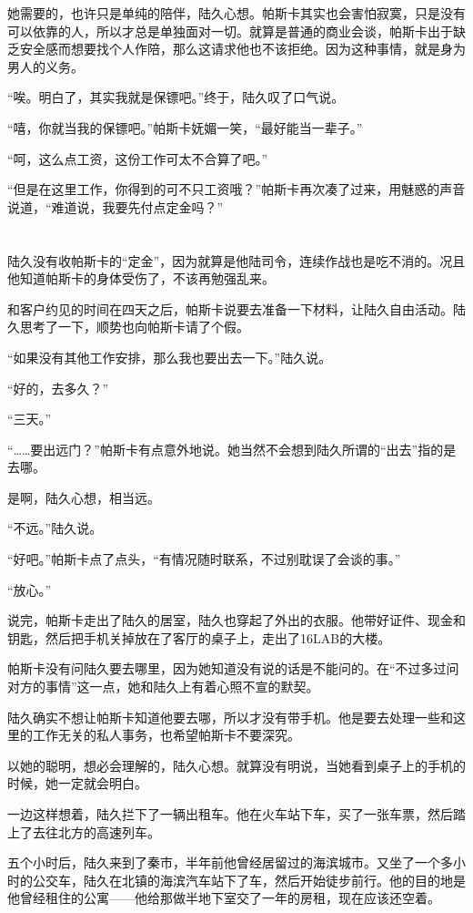 她需要的，也许只是单纯的陪伴，陆久心想。帕斯卡其实也会害怕寂寞，只是没有可以依靠的人，所以才总是单独面对一切。就算是普通的商业会谈，帕斯卡出于缺乏安全感而想要找个人作陪，那么这请求他也不该拒绝。因为这种事情，就是身为男人的义务。

“唉。明白了，其实我就是保镖吧。”终于，陆久叹了口气说。

“嘻，你就当我的保镖吧。”帕斯卡妩媚一笑，“最好能当一辈子。”

“呵，这么点工资，这份工作可太不合算了吧。”

“但是在这里工作，你得到的可不只工资哦？”帕斯卡再次凑了过来，用魅惑的声音说道，“难道说，我要先付点定金吗？”\section*{}

陆久没有收帕斯卡的“定金”，因为就算是他陆司令，连续作战也是吃不消的。况且他知道帕斯卡的身体受伤了，不该再勉强乱来。

和客户约见的时间在四天之后，帕斯卡说要去准备一下材料，让陆久自由活动。陆久思考了一下，顺势也向帕斯卡请了个假。

“如果没有其他工作安排，那么我也要出去一下。”陆久说。

“好的，去多久？”

“三天。”

“……要出远门？”帕斯卡有点意外地说。她当然不会想到陆久所谓的“出去”指的是去哪。

是啊，陆久心想，相当远。

“不远。”陆久说。

“好吧。”帕斯卡点了点头，“有情况随时联系，不过别耽误了会谈的事。”

“放心。”

说完，帕斯卡走出了陆久的居室，陆久也穿起了外出的衣服。他带好证件、现金和钥匙，然后把手机关掉放在了客厅的桌子上，走出了16LAB的大楼。

帕斯卡没有问陆久要去哪里，因为她知道没有说的话是不能问的。在“不过多过问对方的事情”这一点，她和陆久上有着心照不宣的默契。

陆久确实不想让帕斯卡知道他要去哪，所以才没有带手机。他是要去处理一些和这里的工作无关的私人事务，也希望帕斯卡不要深究。

以她的聪明，想必会理解的，陆久心想。就算没有明说，当她看到桌子上的手机的时候，她一定就会明白。

一边这样想着，陆久拦下了一辆出租车。他在火车站下车，买了一张车票，然后踏上了去往北方的高速列车。

五个小时后，陆久来到了秦市，半年前他曾经居留过的海滨城市。又坐了一个多小时的公交车，陆久在北镇的海滨汽车站下了车，然后开始徒步前行。他的目的地是他曾经租住的公寓——他给那做半地下室交了一年的房租，现在应该还空着。

